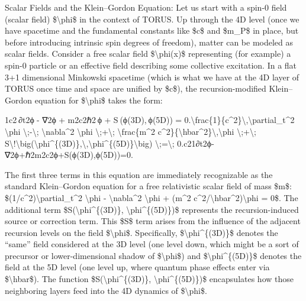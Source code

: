 \documentclass[
]{article}
\begin{document}
Scalar Fields and the Klein--Gordon Equation: Let us start with a spin-0
field (scalar field) \$\textbackslash phi\$ in the context of TORUS. Up
through the 4D level (once we have spacetime and the fundamental
constants like \$c\$ and \$m\_P\$ in place, but before introducing
intrinsic spin degrees of freedom), matter can be modeled as scalar
fields. Consider a free scalar field \$\textbackslash phi(x)\$
representing (for example) a spin-0 particle or an effective field
describing some collective excitation. In a flat 3+1 dimensional
Minkowski spacetime (which is what we have at the 4D layer of TORUS once
time and space are unified by \$c\$), the recursion-modified
Klein--Gordon equation for \$\textbackslash phi\$ takes the form:

1c2 ∂t2ϕ  -  ∇2ϕ  +  m2c2ℏ2 ϕ  +  S ⁣(ϕ(3D), ϕ(5D))  =  0.\textbackslash frac\{1\}\{c\^{}2\}\textbackslash,\textbackslash partial\_t\^{}2
\textbackslash phi \textbackslash;-\textbackslash;
\textbackslash nabla\^{}2 \textbackslash phi
\textbackslash;+\textbackslash; \textbackslash frac\{m\^{}2
c\^{}2\}\{\textbackslash hbar\^{}2\}\textbackslash,\textbackslash phi
\textbackslash;+\textbackslash;
S\textbackslash!\textbackslash big(\textbackslash phi\^{}\{(3D)\},\textbackslash,\textbackslash phi\^{}\{(5D)\}\textbackslash big)
\textbackslash;=\textbackslash;
0.c21\hspace{0pt}∂t2\hspace{0pt}ϕ-∇2ϕ+ℏ2m2c2\hspace{0pt}ϕ+S(ϕ(3D),ϕ(5D))=0.

The first three terms in this equation are immediately recognizable as
the standard Klein--Gordon equation for a free relativistic scalar field
of mass \$m\$: \$(1/c\^{}2)\textbackslash partial\_t\^{}2
\textbackslash phi - \textbackslash nabla\^{}2 \textbackslash phi +
(m\^{}2 c\^{}2/\textbackslash hbar\^{}2)\textbackslash phi = 0\$. The
additional term \$S(\textbackslash phi\^{}\{(3D)\},
\textbackslash phi\^{}\{(5D)\})\$ represents the recursion-induced
source or correction term. This \$S\$ term arises from the influence of
the adjacent recursion levels on the field \$\textbackslash phi\$.
Specifically, \$\textbackslash phi\^{}\{(3D)\}\$ denotes the ``same''
field considered at the 3D level (one level down, which might be a sort
of precursor or lower-dimensional shadow of \$\textbackslash phi\$) and
\$\textbackslash phi\^{}\{(5D)\}\$ denotes the field at the 5D level
(one level up, where quantum phase effects enter via
\$\textbackslash hbar\$). The function
\$S(\textbackslash phi\^{}\{(3D)\}, \textbackslash phi\^{}\{(5D)\})\$
encapsulates how those neighboring layers feed into the 4D dynamics of
\$\textbackslash phi\$.
\end{document}
